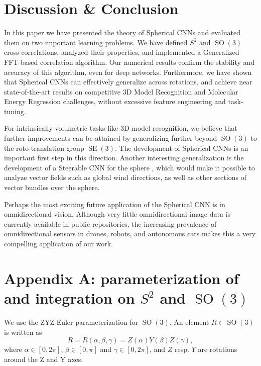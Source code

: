 \documentclass{article} %
\newcommand{\SE}[1]{\ensuremath{\operatorname{SE}(#1)}}
\newcommand{\SO}[1]{\ensuremath{\operatorname{SO}(#1)}}
\begin{document}
\section{Discussion \& Conclusion}

In this paper we have presented the theory of Spherical CNNs and evaluated them on two important learning problems.
We have defined $S^2$ and $\SO3$ cross-correlations, analyzed their properties, and implemented a Generalized FFT-based correlation algorithm.
Our numerical results confirm the stability and accuracy of this algorithm, even for deep networks.
Furthermore, we have shown that Spherical CNNs can effectively generalize across rotations, and achieve near state-of-the-art results on competitive 3D Model Recognition and Molecular Energy Regression challenges, without excessive feature engineering and task-tuning.

For intrinsically volumetric tasks like 3D model recognition, we believe that further improvements can be attained by generalizing further beyond $\SO3$ to the roto-translation group $\SE3$.
The development of Spherical CNNs is an important first step in this direction.
Another interesting generalization is the development of a Steerable CNN for the sphere \citep{Cohen2017}, which would make it possible to analyze vector fields such as global wind directions, as well as other sections of vector bundles over the sphere.

Perhaps the most exciting future application of the Spherical CNN is in omnidirectional vision.
Although very little omnidirectional image data is currently available in public repositories, the increasing prevalence of omnidirectional sensors in drones, robots, and autonomous cars makes this a very compelling application of our work.


%





\section*{Appendix A: parameterization of and integration on $S^2$ and $\SO3$}

We use the ZYZ Euler parameterization for $\SO3$.
An element $R \in \SO3$ is written as
\begin{equation}
  R = R(\alpha, \beta, \gamma) = Z(\alpha) Y(\beta) Z(\gamma),
\end{equation}
where $\alpha \in [0, 2\pi]$, $\beta \in [0, \pi]$ and $\gamma \in [0, 2\pi]$, and $Z$ resp. $Y$ are rotations around the Z and Y axes.
\end{document}
